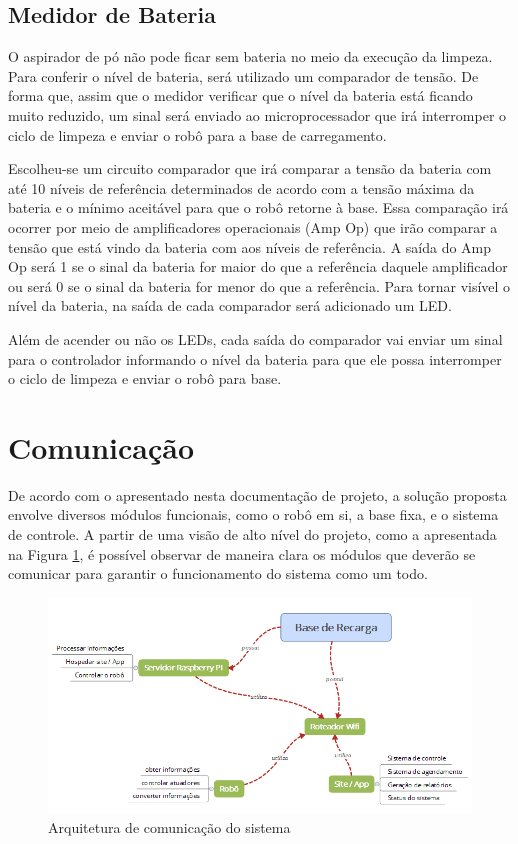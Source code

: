   \subsection{Medidor de Bateria}
  \label{sub:Medidor_de_bateria}
    O aspirador de pó não pode ficar sem bateria no meio da execução da limpeza. Para conferir o nível de bateria, será utilizado um comparador de tensão. De forma que, assim que o medidor verificar que o nível da bateria está ficando muito reduzido, um sinal será enviado ao microprocessador que irá interromper o ciclo de limpeza e enviar o robô para a base de carregamento.

    Escolheu-se um circuito comparador que irá comparar a tensão da bateria com até 10 níveis de referência determinados de acordo com a tensão máxima da bateria e o mínimo aceitável para que o robô retorne à base. Essa comparação irá ocorrer por meio de amplificadores operacionais (Amp Op) que irão comparar a tensão que está vindo da bateria com aos níveis de referência. A saída do Amp Op será 1 se o sinal da bateria for maior do que a referência daquele amplificador ou será 0 se o sinal da bateria for menor do que a referência. Para tornar visível o nível da bateria, na saída de cada comparador será adicionado um LED.

    Além de acender ou não os LEDs, cada saída do comparador vai enviar um sinal para o controlador informando o nível da bateria para que ele possa interromper o ciclo de limpeza e enviar o robô para base.

\section{Comunicação} %
\label{sub:comunicação}
	De acordo com o apresentado nesta documentação de projeto, a solução proposta envolve diversos módulos funcionais, como o robô em si, a base fixa, e o sistema de controle. A partir de uma visão de alto nível do projeto, como a apresentada na Figura \ref{img:arq_comu}, é possível observar de maneira clara os módulos que deverão se comunicar para garantir o funcionamento do sistema como um todo.

	\begin{figure}[H]
		\centering
		\includegraphics[scale=0.8]{figuras/arquitetura_comunicacao.png}
		\caption{Arquitetura de comunicação do sistema}
		\label{img:arq_comu}
	\end{figure}

